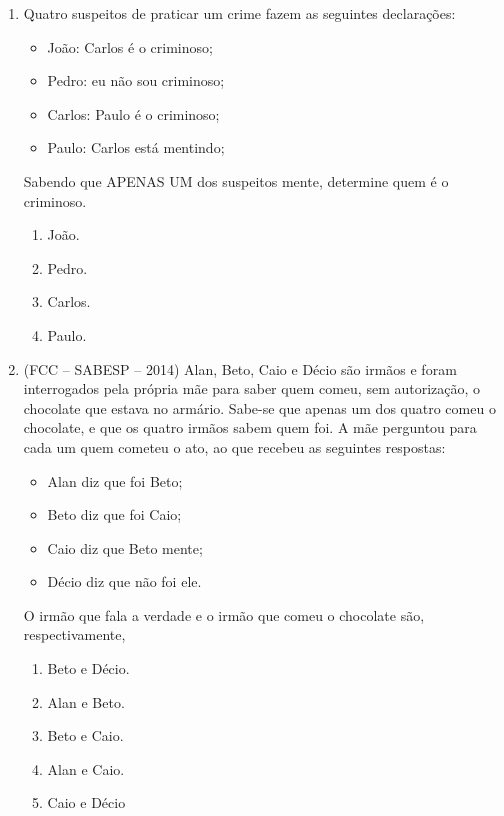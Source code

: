 \documentclass[12pt,a4paper]{article}
\begin{document}
\begin{enumerate}
  \item Quatro suspeitos de praticar um crime fazem as seguintes declarações:
  
    \begin{itemize}
      \item João: Carlos é o criminoso;
      \item Pedro: eu não sou criminoso;
      \item Carlos: Paulo é o criminoso;
      \item Paulo: Carlos está mentindo;
    \end{itemize}

  Sabendo que APENAS UM dos suspeitos mente, determine quem é o criminoso.

    \begin{enumerate}
      \item João.
      \item Pedro.
      \item Carlos.
      \item Paulo.
    \end{enumerate}

  \item (FCC – SABESP – 2014) Alan, Beto, Caio e Décio são irmãos e foram
    interrogados pela própria mãe para saber quem comeu, sem autorização,
    o chocolate que estava no armário. Sabe-se que apenas um dos quatro
    comeu o chocolate, e que os quatro irmãos sabem quem foi. A mãe
    perguntou para cada um quem cometeu o ato, ao que recebeu as seguintes
    respostas:

    \begin{itemize}   
      \item Alan diz que foi Beto;
      \item Beto diz que foi Caio;
      \item Caio diz que Beto mente;
      \item Décio diz que não foi ele.
    \end{itemize}

    O irmão que fala a verdade e o irmão que comeu o chocolate são,
    respectivamente,

    \begin{enumerate}
      \item Beto e Décio.
      \item Alan e Beto.
      \item Beto e Caio.
      \item Alan e Caio.
      \item Caio e Décio
    \end{enumerate}
        

\end{enumerate}
\end{document}
